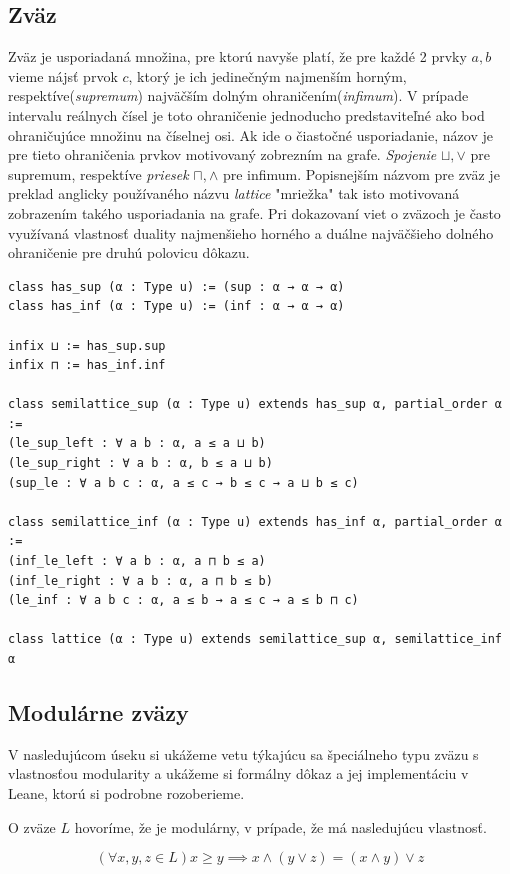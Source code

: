 \documentclass[a4paper,10pt,oneside]{report}%
\begin{document}
\subsection{Zväz}
    Zväz je usporiadaná množina, pre ktorú navyše platí, že pre každé 2 prvky $a, b$
vieme nájsť prvok $c$, ktorý je ich jedinečným najmenším horným, respektíve(\emph{supremum})
najväčším dolným ohraničením(\emph{infimum}).
    V prípade intervalu reálnych čísel je toto ohraničenie jednoducho predstaviteľné
ako bod ohraničujúce množinu na číselnej osi.
    Ak ide o čiastočné usporiadanie, názov je pre tieto ohraničenia prvkov
motivovaný zobrezním na grafe.
    \emph{Spojenie} $\sqcup, \vee$ pre supremum, respektíve \emph{priesek} $\sqcap, \wedge$ pre infimum.
    Popisnejším názvom pre zväz je preklad anglicky používaného názvu \emph{lattice}
"mriežka" tak isto motivovaná zobrazením takého usporiadania na grafe.
    Pri dokazovaní viet o zväzoch je často využívaná vlastnosť duality najmenšieho
horného a duálne najväčšieho dolného ohraničenie pre druhú polovicu dôkazu.
\begin{lstlisting}
class has_sup (α : Type u) := (sup : α → α → α)
class has_inf (α : Type u) := (inf : α → α → α)

infix ⊔ := has_sup.sup
infix ⊓ := has_inf.inf

class semilattice_sup (α : Type u) extends has_sup α, partial_order α :=
(le_sup_left : ∀ a b : α, a ≤ a ⊔ b)
(le_sup_right : ∀ a b : α, b ≤ a ⊔ b)
(sup_le : ∀ a b c : α, a ≤ c → b ≤ c → a ⊔ b ≤ c)

class semilattice_inf (α : Type u) extends has_inf α, partial_order α :=
(inf_le_left : ∀ a b : α, a ⊓ b ≤ a)
(inf_le_right : ∀ a b : α, a ⊓ b ≤ b)
(le_inf : ∀ a b c : α, a ≤ b → a ≤ c → a ≤ b ⊓ c)

class lattice (α : Type u) extends semilattice_sup α, semilattice_inf α
\end{lstlisting}

\subsection{Modulárne zväzy}

    V nasledujúcom úseku si ukážeme vetu týkajúcu sa špeciálneho typu zväzu s vlastnosťou
modularity a ukážeme si formálny dôkaz a jej implementáciu v Leane, ktorú si
podrobne rozoberieme.

    O zväze $L$ hovoríme, že je modulárny, v prípade, že má nasledujúcu vlastnosť.

\begin{equation*}
    (\forall x,y,z \in L) x \geq y \implies x \wedge ( y \vee z) = (x \wedge y) \vee z
\end{equation*}
\end{document}
